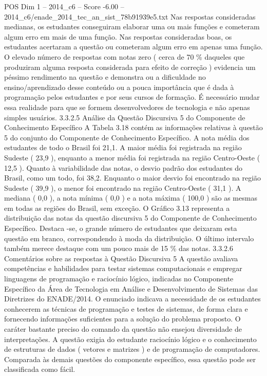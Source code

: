 \begin{textsample}{POS Dim 1 – 2014\_c6 – Score -6.00 – 2014\_c6/enade\_2014\_tec\_an\_sist\_78b91939e5.txt}
Nas respostas consideradas medianas, os estudantes conseguiram elaborar uma ou mais funções e cometeram algum erro em mais de uma função.
Nas respostas consideradas boas, os estudantes acertaram a questão ou cometeram algum erro em apenas uma função.
O elevado número de respostas com notas zero ( cerca de 70 \% daqueles que produziram alguma resposta considerada para efeito de correção ) evidencia um péssimo rendimento na questão e demonstra ou a dificuldade no ensino/aprendizado desse conteúdo ou a pouca importância que é dada à programação pelos estudantes e por seus cursos de formação.
É necessário mudar essa realidade para que se formem desenvolvedores de tecnologia e não apenas simples usuários. 3.3.2.5 Análise da Questão Discursiva 5 do Componente de Conhecimento Específico A Tabela 3.18 contém as informações relativas à questão 5 do conjunto do Componente de Conhecimento Específico.
A nota média dos estudantes de todo o Brasil foi 21,1.
A maior média foi registrada na região Sudeste ( 23,9 ), enquanto a menor média foi registrada na região Centro-Oeste ( 12,5 ).
Quanto à variabilidade das notas, o desvio padrão dos estudantes do Brasil, como um todo, foi 38,2.
Enquanto o maior desvio foi encontrado na região Sudeste ( 39,9 ), o menor foi encontrado na região Centro-Oeste ( 31,1 ).
A mediana ( 0,0 ), a nota mínima ( 0,0 ) e a nota máxima ( 100,0 ) são as mesmas em todas as regiões do Brasil, sem exceção.
O Gráfico 3.13 representa a distribuição das notas da questão discursiva 5 do Componente de Conhecimento Específico.
Destaca -se, o grande número de estudantes que deixaram esta questão em branco, correspondendo à moda da distribuição.
O último intervalo também merece destaque com um pouco mais de 15 \% das notas. 3.3.2.6 Comentários sobre as respostas à Questão Discursiva 5 A questão avaliava competências e habilidades para testar sistemas computacionais e empregar linguagens de programação e raciocínio lógico, indicadas no Componente Específico da Área de Tecnologia em Análise e Desenvolvimento de Sistemas das Diretrizes do ENADE/2014.
O enunciado indicava a necessidade de os estudantes conhecerem as técnicas de programação e testes de sistemas, de forma clara e fornecendo informações suficientes para a solução do problema proposto.
O caráter bastante preciso do comando da questão não ensejou diversidade de interpretações.
A questão exigia do estudante raciocínio lógico e o conhecimento de estruturas de dados ( vetores e matrizes ) e de programação de computadores.
Comparada às demais questões do componente específico, essa questão pode ser classificada como fácil.

\end{textsample}
